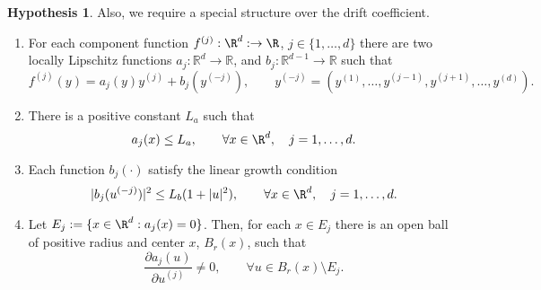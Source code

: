 \documentclass[3p]{elsarticle}
\theoremstyle{definition}
\newtheorem{hypothesis}{Hypothesis}[section]
\theoremstyle{plain}%
\newtheorem{lem}{Lemma}[section]
\theoremstyle{remark}
\newcommand{\innerprod}[2]{\left\langle#1, #2\right\rangle}
\begin{document}
\begin{hypothesis}\label{ass:ajBound} %
	Also, we require a special structure over the drift coefficient.
	\begin{enumerate}[({A}-1)]
		\item\label{ass:FunctionStructure}
		For each component function $f^{(j)}:\R^d:\to \R$, %
		$j \in \{1,\dots, d\}$
		there are two locally Lipschitz functions $a_j:\mathbb{R}^{d} \to \mathbb{R}$, and
		$b_{j}:\mathbb{R}^{d-1} \to \mathbb{R}$ such that 
		\begin{equation}\label{eqn:AlternativeConstruction}
		f^{(j)}(y) = a_j (y) y^{(j)} + b_{j}(y^{(-j)}), \qquad
		y^{(-j)} = (y^{(1)}, \dots ,y^{(j-1)}, y^{(j+1)}, \dots, y^{(d)}).
		\end{equation}
		\item
		There is a positive constant $L_a$ such that
		\begin{equation}
		a_{j}(x) \leq L_a, \qquad \forall x\in \R^d, \quad j=1,\ldots, d.
		\end{equation}
		\item Each function $b_j(\cdot)$ satisfy the linear growth condition
		\begin{equation}\label{eqn:bjLinearGrowthCondition}
		|b_j(u^{(-j)})|^2 \leq L_{b}(1+|u|^2) , \qquad \forall x\in \R^d, \quad j=1,\ldots, d.
		\end{equation}
		\item
		Let $E_j:=\{x\in \R^d: a_j(x)=0\}$. Then, for each $x\in E_j$ there is an open ball of positive 
		radius and center $x$, $B_r(x)$, such that 
		$$
		\frac{\partial a_j(u)}{\partial u^{(j)}}
		\neq 0, \qquad \forall u \in B_r(x) \setminus E_j.
		$$
	\end{enumerate}
\end{hypothesis}
\end{document}
